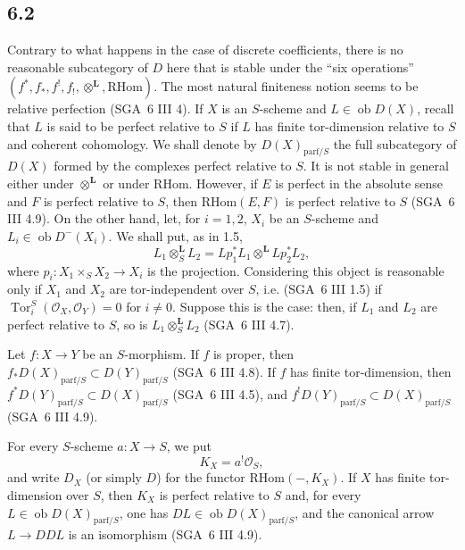 \documentclass[11pt]{article}
\providecommand{\cO}{\mathcal{O}}
\DeclareMathOperator{\Tor}{Tor}
\providecommand{\RHom}{\mathrm{RHom}}
\providecommand{\RHom}{\mathrm{RHom}}
\providecommand{\RHom}{\mathrm R\mathcal{H}om}
\providecommand{\RHom}{\mathrm{RHom}}
\begin{document}
\subsection*{6.2}
Contrary to what happens in the case of discrete coefficients, there is no reasonable subcategory of $D$ here that is stable under the ``six operations'' $(f^*,f_*,f^!,f_!,\otimes^{\mathbf L},\RHom)$. The most natural finiteness notion seems to be relative perfection (SGA~6 III 4). If $X$ is an $S$-scheme and $L\in\operatorname{ob}D(X)$, recall that $L$ is said to be perfect relative to $S$ if $L$ has finite tor-dimension relative to $S$ and coherent cohomology. We shall denote by $D(X)_{\mathrm{parf}/S}$ the full subcategory of $D(X)$ formed by the complexes perfect relative to $S$. It is not stable in general either under $\otimes^{\mathbf L}$ or under $\RHom$. However, if $E$ is perfect in the absolute sense and $F$ is perfect relative to $S$, then $\RHom(E,F)$ is perfect relative to $S$ (SGA~6 III 4.9). On the other hand, let, for $i=1,2$, $X_i$ be an $S$-scheme and $L_i\in\operatorname{ob}D^{-}(X_i)$. We shall put, as in 1.5,
\[
L_1\otimes_S^{\mathbf L}L_2=Lp_1^*L_1\otimes^{\mathbf L}Lp_2^*L_2,
\]
where $p_i:X_1\times_SX_2\to X_i$ is the projection. Considering this object is reasonable only if $X_1$ and $X_2$ are tor-independent over $S$, i.e. (SGA~6 III 1.5) if $\Tor_i^S(\cO_X,\cO_Y)=0$ for $i\ne0$. Suppose this is the case: then, if $L_1$ and $L_2$ are perfect relative to $S$, so is $L_1\otimes_S^{\mathbf L}L_2$ (SGA~6 III 4.7).

Let $f:X\to Y$ be an $S$-morphism. If $f$ is proper, then $f_*D(X)_{\mathrm{parf}/S}\subset D(Y)_{\mathrm{parf}/S}$ (SGA~6 III 4.8). If $f$ has finite tor-dimension, then $f^*D(Y)_{\mathrm{parf}/S}\subset D(X)_{\mathrm{parf}/S}$ (SGA~6 III 4.5), and $f^!D(Y)_{\mathrm{parf}/S}\subset D(X)_{\mathrm{parf}/S}$ (SGA~6 III 4.9).

For every $S$-scheme $a:X\to S$, we put
\begin{equation}
\tag{6.2.1}
K_X=a^!\cO_S,
\end{equation}
and write $D_X$ (or simply $D$) for the functor $\RHom(-,K_X)$. If $X$ has finite tor-dimension over $S$, then $K_X$ is perfect relative to $S$ and, for every $L\in\operatorname{ob}D(X)_{\mathrm{parf}/S}$, one has $DL\in\operatorname{ob}D(X)_{\mathrm{parf}/S}$, and the canonical arrow $L\to DDL$ is an isomorphism (SGA~6 III 4.9).
\end{document}
